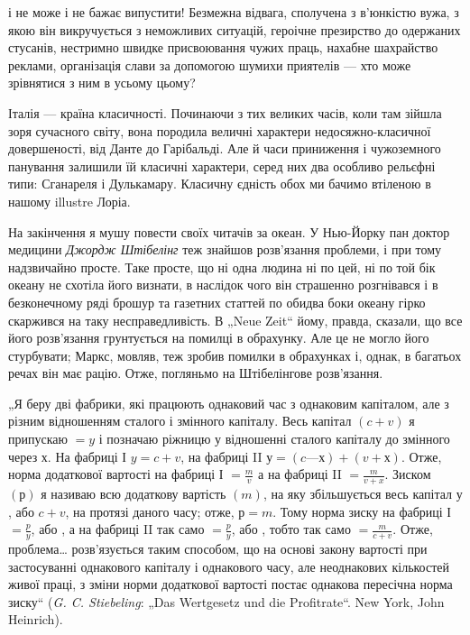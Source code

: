 \parcont{}  %
і не може і не бажає випустити! Безмежна відвага, сполучена
з в’юнкістю вужа, з якою він викручується з неможливих ситуацій,
героічне презирство до одержаних стусанів, нестримно швидке
присвоювання чужих праць, нахабне шахрайство реклами, організація
слави за допомогою шумихи приятелів — хто може зрівнятися
з ним в усьому цьому?

Італія — країна класичності. Починаючи з тих великих часів,
коли там зійшла зоря сучасного світу, вона породила величні
характери недосяжно-класичної довершеності, від Данте до
Гарібальді. Але й часи приниження і чужоземного панування
залишили їй класичні характери, серед них два особливо рельєфні
типи: Сганареля і Дулькамару. Класичну єдність обох ми
бачимо втіленою в нашому illustre Лоріа.

На закінчення я мушу повести своїх читачів за океан. У Нью-Йорку
пан доктор медицини \emph{Джордж Штібелінг} теж знайшов
розв’язання проблеми, і при тому надзвичайно просте. Таке
просте, що ні одна людина ні по цей, ні по той бік океану не
схотіла його визнати, в наслідок чого він страшенно розгнівався
і в безконечному ряді брошур та газетних статтей по обидва
боки океану гірко скаржився на таку несправедливість. В „Neue
Zeit“ йому, правда, сказали, що все його розв’язання грунтується
на помилці в обрахунку. Але це не могло його стурбувати;
Маркс, мовляв, теж зробив помилки в обрахунках і, однак,
в багатьох речах він має рацію. Отже, погляньмо на Штібелінгове
розв’язання.

„Я беру дві фабрики, які працюють однаковий час з однаковим
капіталом, але з різним відношенням сталого і змінного
капіталу. Весь капітал $(c + v)$ я припускаю $= y$ і позначаю ріжницю
у відношенні сталого капіталу до змінного через $х$. На
фабриці І $y = c + v$, на фабриці II $у = (c — х) + (v + х)$. Отже,
норма додаткової вартості на фабриці І $= \frac{m}{v}$ а на фабриці II $=
\frac{m}{v+x}$. Зиском $(р)$ я називаю всю додаткову вартість $(m)$, на
яку збільшується весь капітал $у$, або $c + v$, на протязі даного
часу; отже, $р = m$. Тому норма зиску на фабриці І $= \frac{p}{y}$, або
, а на фабриці II так само $= \frac{p}{y}$, або , тобто
так само $= \frac{m}{c + v}$. Отже, проблема\dots{} розв’язується таким способом,
що на основі закону вартості при застосуванні однакового
капіталу і однакового часу, але неоднакових кількостей
живої праці, з зміни норми додаткової вартості постає однакова
пересічна норма зиску“ (\emph{G. C. Stiebeling}: „Das Wertgesetz und die
Profitrate“. New York, John Heinrich).
